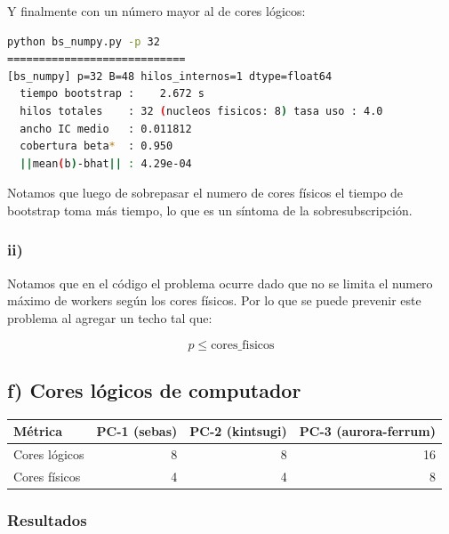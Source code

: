\documentclass[11pt]{article}
\begin{document}
Y finalmente con un n\'umero mayor al de cores l\'ogicos:

\begin{lstlisting}[language=sh]
python bs_numpy.py -p 32
============================
[bs_numpy] p=32 B=48 hilos_internos=1 dtype=float64
  tiempo bootstrap :    2.672 s
  hilos totales    : 32 (nucleos fisicos: 8) tasa uso : 4.0
  ancho IC medio   : 0.011812
  cobertura beta*  : 0.950
  ||mean(b)-bhat|| : 4.29e-04
\end{lstlisting}

Notamos que luego de sobrepasar el numero de cores f\'isicos el tiempo de bootstrap toma m\'as tiempo, lo que es un s\'intoma de la sobresubscripci\'on.

\subsubsection*{ii)}

Notamos que en el c\'odigo el problema ocurre dado que no se limita el numero m\'aximo de workers seg\'un los cores f\'isicos. Por lo que se puede prevenir este problema al agregar un techo tal que:

\[
p \leq \text{cores\_fisicos}
\]

\subsection*{f) Cores l\'ogicos de computador}

\begin{center}
\begin{tabular}{lrrr}
\toprule
M\'etrica & PC-1 (sebas) & PC-2 (kintsugi) & PC-3 (aurora-ferrum) \\
\midrule
Cores l\'ogicos & 8 & 8 & 16 \\
Cores f\'isicos & 4 & 4 & 8 \\
\bottomrule
\end{tabular}
\end{center}

\subsubsection*{Resultados}
\end{document}

